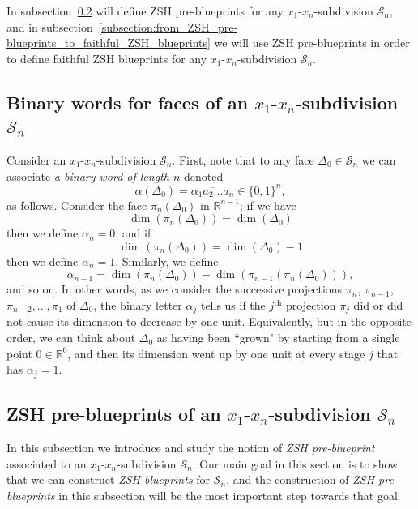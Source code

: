 \documentclass[12pt,letterpaper]{article}
\renewcommand{\S}{\mathcal{S}}
\newcommand{\RR}{\mathbb{R}}
\renewcommand{\a}{\alpha}
\renewcommand{\d}{\Delta}
\begin{document}
In subsection~\ref{subsection:ZSH_pre-blueprints} will define ZSH pre-blueprints for any $x_1$-$x_n$-subdivision $\S_n$, and in subsection~\ref{subsection:from_ZSH_pre-blueprints_to_faithful_ZSH_blueprints} we will use ZSH pre-blueprints in order to define faithful ZSH blueprints for any $x_1$-$x_n$-subdivision $\S_n$.




\subsection{Binary words for faces of an $x_1$-$x_n$-subdivision $\S_n$}


Consider an $x_1$-$x_n$-subdivision $\S_n$. 
First, note that to any face
$\Delta_0 \in \S_n$ we can associate {\em a binary word of length $n$} denoted 
$$
\alpha(\Delta_0) = \overline{\a_1 a_2 ... a_n} \in \{ 0,1 \}^n,
$$
as follows. 
Consider the face $\pi_n(\d_0)$ in $\RR^{n-1}$;  if we have
$$
\dim(\pi_n(\d_0)) = \dim(\d_0)
$$
then we define $\a_n = 0$, and if 
$$
\dim(\pi_n(\d_0)) = \dim(\d_0) - 1
$$
then we define $\a_n = 1$.
Similarly, we define
$$
\a_{n-1} = \dim(\pi_n(\d_0)) - \dim(\pi_{n-1}(\pi_n(\d_0))),
$$
and so on. In other words, as we consider the successive projections $\pi_n$, $\pi_{n-1}$, $\pi_{n-2}, ..., \pi_1$ of $\d_0$, the binary letter $\a_j$ tells us if the $j^\mathrm{th}$ projection $\pi_j$ did or did not cause its dimension to decrease by one unit. Equivalently, but in the opposite order, we can think about $\d_0$ as having been ``grown" by starting from a single point $0 \in \RR^0$, and then its dimension went up by one  unit at every stage $j$ that has $\a_j = 1$.















\bigskip



\subsection{ZSH pre-blueprints of an $x_1$-$x_n$-subdivision $\S_n$}
\label{subsection:ZSH_pre-blueprints}

In this subsection we introduce and study the notion of {\em ZSH pre-blueprint} associated to an $x_1$-$x_n$-subdivision $\S_n$. Our main goal in this section is to show that we can construct {\em ZSH blueprints} for $\S_n$, and the construction of {\em ZSH pre-blueprints} in this subsection will be the most important step towards that goal. 
\end{document}
